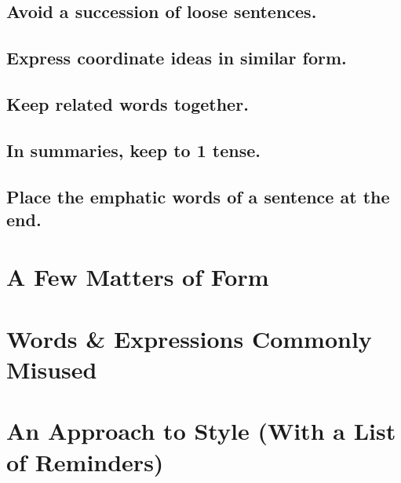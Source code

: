 \documentclass{article}
\numberwithin{equation}{section}
\begin{document}
\subsection{Avoid a succession of loose sentences.}


\subsection{Express coordinate ideas in similar form.}


\subsection{Keep related words together.}


\subsection{In summaries, keep to 1 tense.}


\subsection{Place the emphatic words of a sentence at the end.}


\section{A Few Matters of Form}


\section{Words \& Expressions Commonly Misused}


\section{An Approach to Style (With a List of Reminders)}
\end{document}
